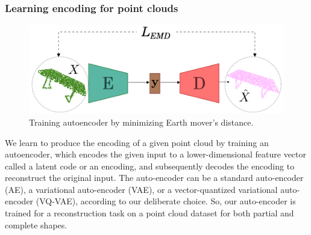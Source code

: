         \subsubsection{Learning encoding for point clouds}
        \begin{figure}[htb]
          \begin{center}
          \includegraphics[width=\linewidth]{figures/emd_ae.png}
          \end{center}
          \caption{Training autoencoder by minimizing Earth mover's distance.}\label{fig:emd_ae}
        \end{figure}
        We learn to produce the encoding of a given point cloud by training an autoencoder, which encodes the given input to a lower-dimensional feature vector called a latent code or an encoding, and subsequently decodes the encoding to reconstruct the original input. The auto-encoder can be a standard auto-encoder (AE), a variational auto-encoder (VAE), or a vector-quantized variational auto-encoder (VQ-VAE), according to our deliberate choice. So, our auto-encoder is trained for a reconstruction task on a point cloud dataset for both partial and complete shapes.

